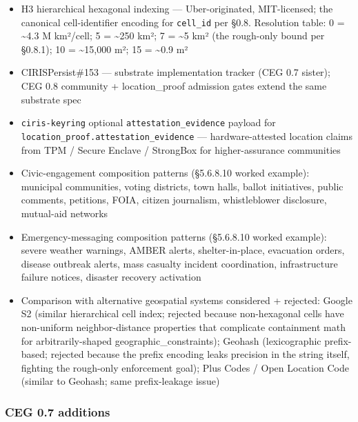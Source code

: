 \documentclass[10pt]{article}
\begin{document}
\begin{itemize}\setlength\itemsep{0pt}
\item H3 hierarchical hexagonal indexing — Uber-originated, MIT-licensed; the canonical cell-identifier encoding for \texttt{cell\_id} per §0.8. Resolution table: 0 = \textasciitilde{}4.3 M km²/cell; 5 = \textasciitilde{}250 km²; 7 = \textasciitilde{}5 km² (the rough-only bound per §0.8.1); 10 = \textasciitilde{}15,000 m²; 15 = \textasciitilde{}0.9 m²
\item CIRISPersist\#153 — substrate implementation tracker (CEG 0.7 sister); CEG 0.8 community + location\_proof admission gates extend the same substrate spec
\item \texttt{ciris-keyring} optional \texttt{attestation\_evidence} payload for \texttt{location\_proof.attestation\_evidence} — hardware-attested location claims from TPM / Secure Enclave / StrongBox for higher-assurance communities
\item Civic-engagement composition patterns (§5.6.8.10 worked example): municipal communities, voting districts, town halls, ballot initiatives, public comments, petitions, FOIA, citizen journalism, whistleblower disclosure, mutual-aid networks
\item Emergency-messaging composition patterns (§5.6.8.10 worked example): severe weather warnings, AMBER alerts, shelter-in-place, evacuation orders, disease outbreak alerts, mass casualty incident coordination, infrastructure failure notices, disaster recovery activation
\item Comparison with alternative geospatial systems considered + rejected: Google S2 (similar hierarchical cell index; rejected because non-hexagonal cells have non-uniform neighbor-distance properties that complicate containment math for arbitrarily-shaped geographic\_constraints); Geohash (lexicographic prefix-based; rejected because the prefix encoding leaks precision in the string itself, fighting the rough-only enforcement goal); Plus Codes / Open Location Code (similar to Geohash; same prefix-leakage issue)
\end{itemize}


\subsubsection*{CEG 0.7 additions}
\end{document}
